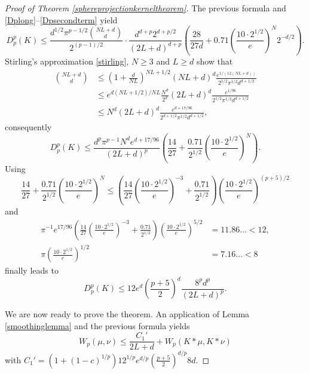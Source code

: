 \documentclass[11pt,a4paper]{article}
\theoremstyle{definition}
\begin{document}
\begin{proof}[Proof of Theorem \ref{sphereprojectionkerneltheorem}]
The previous formula and \eqref{Dplong}--\eqref{Dpsecondterm} yield
\[ D_p^p(K) \le \frac{d^{1/2} \pi^{p-1/2} \binom{NL+d}{d}}{2^{(p-1)/2}} \cdot \frac{d^{d+p}2^{d+p/2}}{(2L+d)^{d+p}} \left( \frac{28}{27d} + 0.71 \left( \frac{10 \cdot 2^{1/2}}{e} \right)^N 2^{-d/2} \right) . \]
Stirling's approximation \eqref{stirling}, $N \ge 3$ and $L \ge d$ show that
\[ \begin{split} \binom{NL+d}{d} &\le \left(1+\frac{d}{NL} \right)^{NL+1/2} (NL+d)^{d} \frac{e^{1/(12(NL+d))}}{2^{1/2} \pi^{1/2} d^{d+1/2}} \\ &\le e^{d(NL+1/2)/NL} \frac{N^d}{2^d} (2L+d)^d \frac{e^{1/96}}{2^{1/2} \pi^{1/2} d^{d+1/2}} \\ &\le N^d (2L+d)^d \frac{e^{d+17/96}}{2^{d+1/2}\pi^{1/2} d^{d+1/2}} , \end{split} \]
consequently
\[ D_p^p (K) \le \frac{d^p \pi^{p-1}N^d e^{d+17/96}}{(2L+d)^p} \left( \frac{14}{27} + \frac{0.71}{2^{1/2}} \left( \frac{10 \cdot 2^{1/2}}{e} \right)^N \right) . \]
Using
\[ \frac{14}{27} + \frac{0.71}{2^{1/2}} \left( \frac{10 \cdot 2^{1/2}}{e} \right)^N \le \left( \frac{14}{27} \left( \frac{10 \cdot 2^{1/2}}{e} \right)^{-3} + \frac{0.71}{2^{1/2}} \right) \left( \frac{10 \cdot 2^{1/2}}{e} \right)^{(p+5)/2} \]
and
\[ \begin{split} \pi^{-1} e^{17/96} \left( \frac{14}{27} \left( \frac{10 \cdot 2^{1/2}}{e} \right)^{-3} + \frac{0.71}{2^{1/2}} \right) \left( \frac{10 \cdot 2^{1/2}}{e} \right)^{5/2} &= 11.86\ldots < 12 , \\ \pi \left( \frac{10 \cdot 2^{1/2}}{e} \right)^{1/2} &= 7.16\ldots <8 \end{split} \]
finally leads to
\[ D_p^p (K) \le 12 e^d \left(\frac{p+5}{2} \right)^d  \frac{8^p d^p}{(2L+d)^p} . \]

We are now ready to prove the theorem. An application of Lemma \ref{smoothinglemma} and the previous formula yields
\begin{equation}\label{spherestep1}
W_p (\mu, \nu) \le \frac{C_1'}{2L+d} + W_p (K*\mu, K*\nu)
\end{equation}
with $C_1'=(1+(1-c)^{1/p}) 12^{1/p} e^{d/p}(\frac{p+5}{2})^{d/p} 8d$.


\end{proof}
\end{document}
